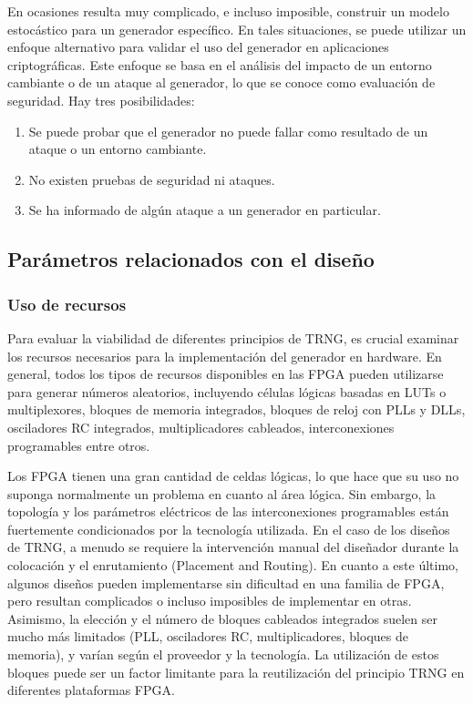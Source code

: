             En ocasiones resulta muy complicado, e incluso imposible, construir un modelo estocástico para un generador específico. En tales situaciones, se puede utilizar un enfoque alternativo para validar el uso del generador en aplicaciones criptográficas. Este enfoque se basa en el análisis del impacto de un entorno cambiante o de un ataque al generador, lo que se conoce como evaluación de seguridad. Hay tres posibilidades: 
            
            \begin{enumerate}[noitemsep, label=(\roman*)]
                \item Se puede probar que el generador no puede fallar como resultado de un ataque o un entorno cambiante.
                \item No existen pruebas de seguridad ni ataques.
                \item Se ha informado de algún ataque a un generador en particular.
            \end{enumerate}		

        \subsection{Parámetros relacionados con el diseño}	
    
            \subsubsection{Uso de recursos}
            
            Para evaluar la viabilidad de diferentes principios de TRNG, es crucial examinar los recursos necesarios para la implementación del generador en hardware. En general, todos los tipos de recursos disponibles en las FPGA pueden utilizarse para generar números aleatorios, incluyendo células lógicas basadas en LUTs o multiplexores, bloques de memoria integrados, bloques de reloj con PLLs y DLLs, osciladores RC integrados, multiplicadores cableados, interconexiones programables entre otros.
                
            Los FPGA tienen una gran cantidad de celdas lógicas, lo que hace que su uso no suponga normalmente un problema en cuanto al área lógica. Sin embargo, la topología y los parámetros eléctricos de las interconexiones programables están fuertemente condicionados por la tecnología utilizada. En el caso de los diseños de TRNG, a menudo se requiere la intervención manual del diseñador durante la colocación y el enrutamiento (Placement and Routing). En cuanto a este último, algunos diseños pueden implementarse sin dificultad en una familia de FPGA, pero resultan complicados o incluso imposibles de implementar en otras. Asimismo, la elección y el número de bloques cableados integrados suelen ser mucho más limitados (PLL, osciladores RC, multiplicadores, bloques de memoria), y varían según el proveedor y la tecnología. La utilización de estos bloques puede ser un factor limitante para la reutilización del principio TRNG en diferentes plataformas FPGA.

